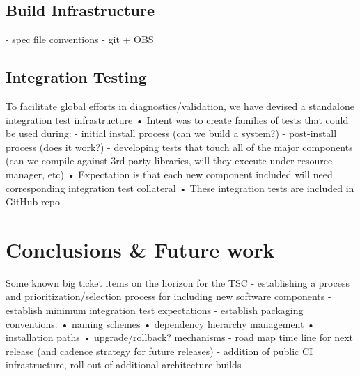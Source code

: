 \documentclass{sig-alternate-05-2015}
\begin{document}




\subsection{Build Infrastructure}

 - spec file conventions
 - git + OBS
 
\subsection{Integration Testing}
 To facilitate global efforts in diagnostics/validation, we have devised a standalone integration test infrastructure
 • Intent was to create families of tests that could be used during:
 - initial install process (can we build a system?)
 - post-install process (does it work?)
 - developing tests that touch all of the major components (can we compile against 3rd party libraries, will they execute under resource manager, etc)
 • Expectation is that each new component included will need corresponding integration test collateral
 • These integration tests are included in GitHub repo


\section{Conclusions \& Future work}
Some known big ticket items on the horizon for the TSC
- establishing a process and prioritization/selection process for including
new software components
- establish minimum integration test expectations
- establish packaging conventions:
• naming schemes
• dependency hierarchy management • installation paths
• upgrade/rollback? mechanisms
- road map time line for next release (and cadence strategy for future releases)
- addition of public CI infrastructure, roll out of additional architecture builds




\end{document}

